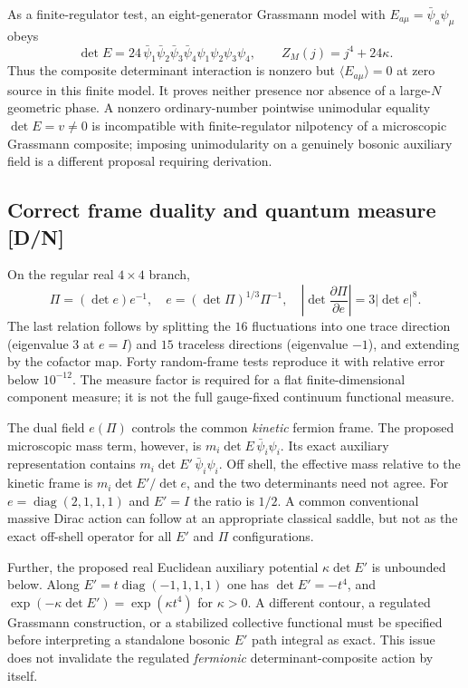 \documentclass[11pt,a4paper]{article}
\begin{document}
As a finite-regulator test, an eight-generator Grassmann model with $E_{a\mu}=\bar\psi_a\psi_\mu$ obeys
\begin{equation}\label{eq:v14-detGrass}
\det E=24\,\bar\psi_1\bar\psi_2\bar\psi_3\bar\psi_4\psi_1\psi_2\psi_3\psi_4,\qquad
Z_M(j)=j^4+24\kappa.
\end{equation}
Thus the composite determinant interaction is nonzero but $\langle E_{a\mu}\rangle=0$ at zero source in this finite model. It proves neither presence nor absence of a large-$N$ geometric phase. A nonzero ordinary-number pointwise unimodular equality $\det E=v\ne0$ is incompatible with finite-regulator nilpotency of a microscopic Grassmann composite; imposing unimodularity on a genuinely bosonic auxiliary field is a different proposal requiring derivation.

\subsection{Correct frame duality and quantum measure [D/N]}
\label{sec:v14-measure}
On the regular real $4\times4$ branch,
\begin{equation}\label{eq:v14-duality}
\boxed{\Pi=(\det e)e^{-1},\quad e=(\det\Pi)^{1/3}\Pi^{-1},\quad
\left|\det\frac{\partial\Pi}{\partial e}\right|=3|\det e|^8.}
\end{equation}
The last relation follows by splitting the $16$ fluctuations into one trace direction (eigenvalue $3$ at $e=I$) and $15$ traceless directions (eigenvalue $-1$), and extending by the cofactor map. Forty random-frame tests reproduce it with relative error below $10^{-12}$. The measure factor is required for a flat finite-dimensional component measure; it is not the full gauge-fixed continuum functional measure.

The dual field $e(\Pi)$ controls the common \emph{kinetic} fermion frame. The proposed microscopic mass term, however, is $m_i\det E\,\bar\psi_i\psi_i$. Its exact auxiliary representation contains $m_i\det E'\,\bar\psi_i\psi_i$. Off shell, the effective mass relative to the kinetic frame is $m_i\det E'/\det e$, and the two determinants need not agree. For $e=\operatorname{diag}(2,1,1,1)$ and $E'=I$ the ratio is $1/2$. A common conventional massive Dirac action can follow at an appropriate classical saddle, but not as the exact off-shell operator for all $E'$ and $\Pi$ configurations.

Further, the proposed real Euclidean auxiliary potential $\kappa\det E'$ is unbounded below. Along $E'=t\operatorname{diag}(-1,1,1,1)$ one has $\det E'=-t^4$, and $\exp(-\kappa\det E')=\exp(\kappa t^4)$ for $\kappa>0$. A different contour, a regulated Grassmann construction, or a stabilized collective functional must be specified before interpreting a standalone bosonic $E'$ path integral as exact. This issue does not invalidate the regulated \emph{fermionic} determinant-composite action by itself.
\end{document}
